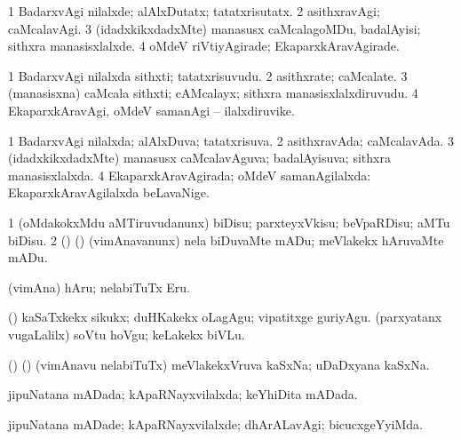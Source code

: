 \bentry
{} 
\gl{\gu}
\expl{}
\bmng
\bnum
\num{1} BadarxvAgi nilalxde; alAlxDutatx; tatatxrisutatx. 
\num{2} asithxravAgi; caMcalavAgi. 
\num{3} (idadxkikxdadxMte) manasusx caMcalagoMDu, badalAyisi; sithxra manasisxlalxde. 
\num{4} oMdeV riVtiyAgirade; EkaparxkAravAgirade. 
\enum
\emng
\eentry

\bentry
{} 
\gl{\nA}
\expl{}
\bmng
\bnum
\num{1} BadarxvAgi nilalxda sithxti; tatatxrisuvudu. 
\num{2} asithxrate; caMcalate. 
\num{3} (manasisxna) caMcala sithxti; cAMcalayx; sithxra manasisxlalxdiruvudu. 
\num{4} EkaparxkAravAgi, oMdeV samanAgi -- ilalxdiruvike. 
\enum
\emng
\eentry

\bentry
{} 
\gl{\gu}
\bmng
\bnum
\num{1} BadarxvAgi nilalxda; alAlxDuva; tatatxrisuva. 
\num{2} asithxravAda; caMcalavAda. 
\num{3} (idadxkikxdadxMte) manasusx caMcalavAguva; badalAyisuva; sithxra manasisxlalxda. 
\num{4} EkaparxkAravAgirada; oMdeV samanAgilalxda:  EkaparxkAravAgilalxda beLavaNige. 
\enum
\emng
\eentry

\bentry
{} 
\gl{\kirx}

\gl{\sakirx}
\expl{}
\bmng
\bnum
\num{1} (oMdakokxMdu aMTiruvudanunx) biDisu; parxteyxVkisu; beVpaRDisu; aMTu biDisu. 
\num{2} (\vAyA) (\AmA) (vimAnavanunx) nela biDuvaMte mADu; meVlakekx hAruvaMte mADu. 
\enum
\emng

\noindent
\gl{\akirx}
\expl{}
\bmng
(vimAna) hAru; nelabiTuTx Eru. 
\emng

\noindent
\gl{\pagu}
\expl{}
\bmng
{} (\AmA) 
\banum
{} kaSaTxkekx sikukx; duHKakekx oLagAgu; vipatitxge guriyAgu. 
 (parxyatanx \mo vugaLalilx) soVtu hoVgu; keLakekx biVLu. 
\eanum
\emng
\eentry

\bentry
{} 
\gl{\nA}
\expl{}
\bmng
(\vAyA) (\AmA) (vimAnavu nelabiTuTx) meVlakekxVruva kaSxNa; uDaDxyana kaSxNa. 
\emng
\eentry

\bentry
{} 
\gl{\gu}
\expl{}
\bmng
jipuNatana mADada; kApaRNayxvilalxda; keYhiDita mADada. 
\emng
\eentry

\bentry
{} 
\gl{\kirxvi}
\expl{}
\bmng
jipuNatana mADade; kApaRNayxvilalxde; dhArALavAgi; bicucxgeYyiMda. 
\emng
\eentry

